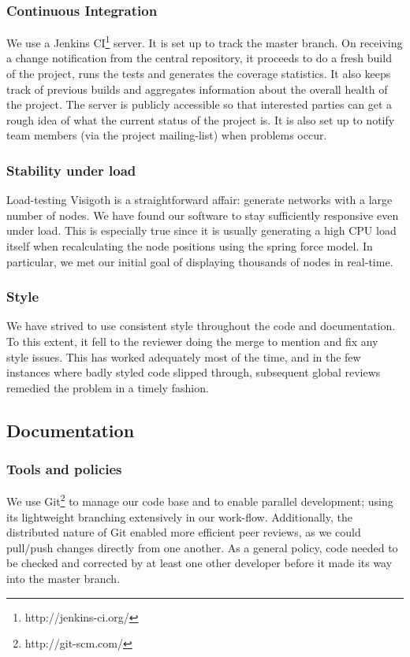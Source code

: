 \documentclass[a4paper,11pt,titlepage]{article}
\begin{document}
\subsubsection{Continuous Integration}
We use a Jenkins CI\footnote{http://jenkins-ci.org/} server. It is
set up to track the master branch. On receiving a change notification
from the central repository, it proceeds to do a fresh build of the
project, runs the tests and generates the coverage statistics. It
also keeps track of previous builds and aggregates information about
the overall health of the project.
The server is publicly accessible so that interested parties can get
a rough idea of what the current status of the project is. It is also
set up to notify team members (via the project mailing-list) when
problems occur.

\subsubsection{Stability under load}
Load-testing Visigoth is a straightforward affair: generate networks
with a large number of nodes. We have found our software to stay
sufficiently responsive even under load. This is especially true
since it is usually generating a high CPU load itself when
recalculating the node positions using the spring force model. In
particular, we met our initial goal of displaying thousands of nodes
in real-time.

\subsubsection{Style}
We have strived to use consistent style throughout the code and
documentation. To this extent, it fell to the reviewer doing the
merge to mention and fix any style issues. This has worked adequately
most of the time, and in the few instances where badly styled code
slipped through, subsequent global reviews remedied the problem in a
timely fashion.


\subsection{Documentation}

\subsubsection{Tools and policies}
We use Git\footnote{http://git-scm.com/} to manage our code base and
to enable parallel development; using its lightweight branching
extensively in our work-flow.  Additionally, the distributed nature
of Git enabled more efficient peer reviews, as we could pull/push
changes directly from one another. As a general policy, code needed
to be checked and corrected by at least one other developer before it
made its way into the master branch.
\end{document}
